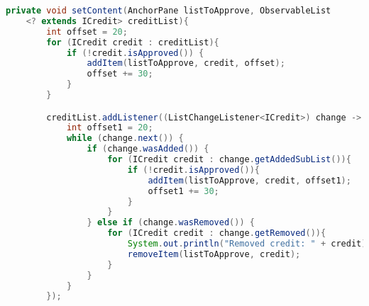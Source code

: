 \begin{lstlisting}[language=Java]
    private void setContent(AnchorPane listToApprove, ObservableList
    <? extends ICredit> creditList){
        int offset = 20;
        for (ICredit credit : creditList){
            if (!credit.isApproved()) {
                addItem(listToApprove, credit, offset);
                offset += 30;
            }
        }

        creditList.addListener((ListChangeListener<ICredit>) change -> {
            int offset1 = 20;
            while (change.next()) {
                if (change.wasAdded()) {
                    for (ICredit credit : change.getAddedSubList()){
                        if (!credit.isApproved()){
                            addItem(listToApprove, credit, offset1);
                            offset1 += 30;
                        }
                    }
                } else if (change.wasRemoved()) {
                    for (ICredit credit : change.getRemoved()){
                        System.out.println("Removed credit: " + credit);
                        removeItem(listToApprove, credit);
                    }
                }
            }
        });
\end{lstlisting}




